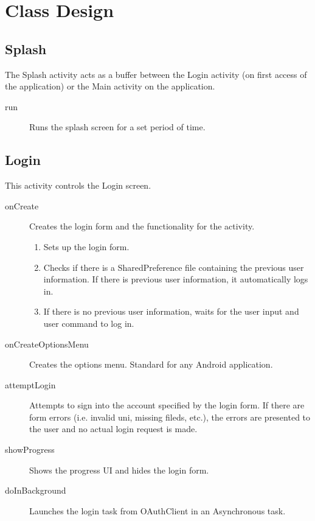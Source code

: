 \documentclass{article}
\begin{document}
\section{Class Design}

\subsection{Splash} 
The Splash activity acts as a buffer between the Login activity (on first access of the application) or the Main activity on the application. 
\begin{description}
\item[run] Runs the splash screen for a set period of time.
\end{description}

\subsection{Login}
This activity controls the Login screen.
\begin{description}
\item[onCreate] Creates the login form and the functionality for the activity. 
\begin{enumerate}
\item Sets up the login form.
\item Checks if there is a SharedPreference file containing the previous user information. If there is previous user information, it automatically logs in.
\item If there is no previous user information, waits for the user input and user 
command to log in.
\end{enumerate}
\item[onCreateOptionsMenu] Creates the options menu. Standard for any Android 
application.
\item[attemptLogin] Attempts to sign into the account specified by the login form. If there are form errors (i.e. invalid uni, missing fileds, etc.), the errors are presented to the user and no actual login request is made.
\item[showProgress] Shows the progress UI and hides the login form.
\item[doInBackground] Launches the login task from OAuthClient in an Asynchronous task.
\end{description}

\end{document}

